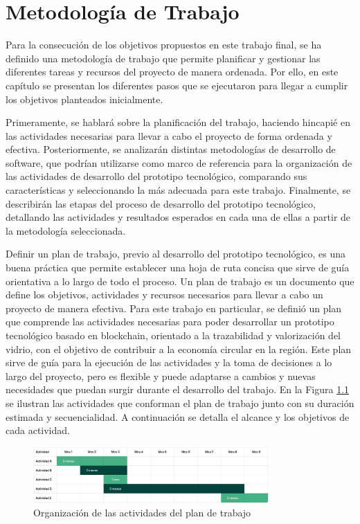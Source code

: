 \chapter[Metodología de Trabajo]{Metodología de Trabajo}
\label{cp:methodology}

\parindent0pt

Para la consecución de los objetivos propuestos en este trabajo final, se ha definido una metodología de trabajo que permite planificar y gestionar las diferentes tareas y recursos del proyecto de manera ordenada. Por ello, en este capítulo se presentan los diferentes pasos que se ejecutaron para llegar a cumplir los objetivos planteados inicialmente. 

Primeramente, se hablará sobre la planificación del trabajo, haciendo hincapié en las actividades necesarias para llevar a cabo el proyecto de forma ordenada y efectiva. Posteriormente, se analizarán distintas metodologías de desarrollo de software, que podrían utilizarse como marco de referencia para la organización de las actividades de desarrollo del prototipo tecnológico, comparando sus características y seleccionando la más adecuada para este trabajo. Finalmente, se describirán las etapas del proceso de desarrollo del prototipo tecnológico, detallando las actividades y resultados esperados en cada una de ellas a partir de la metodología seleccionada.

Definir un plan de trabajo, previo al desarrollo del prototipo tecnológico, es una buena práctica que permite establecer una hoja de ruta concisa que sirve de guía orientativa a lo largo de todo el proceso. Un plan de trabajo es un documento que define los objetivos, actividades y recursos necesarios para llevar a cabo un proyecto de manera efectiva. Para este trabajo en particular, se definió un plan que comprende las actividades necesarias para poder desarrollar un prototipo tecnológico basado en blockchain, orientado a la trazabilidad y valorización del vidrio, con el objetivo de contribuir a la economía circular en la región. Este plan sirve de guía para la ejecución de las actividades y la toma de decisiones a lo largo del proyecto, pero es flexible y puede adaptarse a cambios y nuevas necesidades que puedan surgir durante el desarrollo del trabajo. En la Figura \ref{fig:activities-plan} se ilustran las actividades que conforman el plan de trabajo junto con su duración estimada y secuencialidad. A continuación se detalla el alcance y los objetivos de cada actividad.

\begin{figure}[!htb]
    \centering
    \includegraphics[width=0.8\textwidth]{Figures/activities-plan.png}
    \caption{Organización de las actividades del plan de trabajo}
    \label{fig:activities-plan}
\end{figure}

